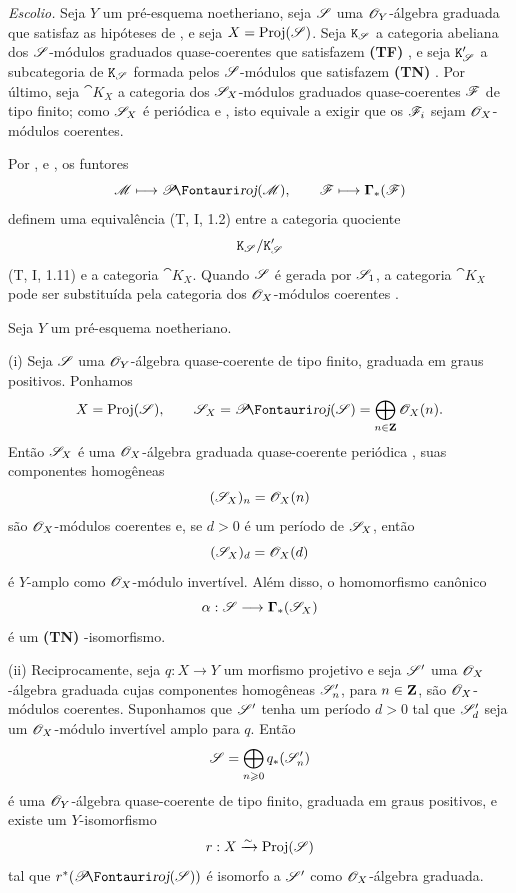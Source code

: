 \begin{env}[2.3.3]
\label{III.2.3.3}
\emph{Escolio.}
Seja $Y$ um pré-esquema noetheriano, seja $\mathscr{S}$ uma $\mathscr{O}_Y$-álgebra graduada que satisfaz as hipóteses de , e seja $X=\operatorname{Proj}(\mathscr{S})$.
Seja $\mathtt{K}_{\mathscr{S}}$ a categoria abeliana dos $\mathscr{S}$-módulos graduados quase-coerentes que satisfazem \textbf{(TF) }, e seja $\mathtt{K}'_{\mathscr{S}}$ a subcategoria de $\mathtt{K}_{\mathscr{S}}$ formada pelos $\mathscr{S}$-módulos que satisfazem \textbf{(TN) }.
Por último, seja $\cat{K}_X$ a categoria dos $\mathscr{S}_X$-módulos graduados quase-coerentes $\mathscr{F}$ de tipo finito; como $\mathscr{S}_X$ é periódica  e , isto equivale a exigir que os $\mathscr{F}_i$ sejam $\mathscr{O}_X$-módulos coerentes.

Por ,  e , os funtores
\[
  \sh{M}\longmapsto\shProj(\sh{M}),
  \qquad
  \sh{F}\longmapsto\bbGamma_*(\sh{F})
\]
definem uma equivalência (T, I, 1.2) entre a categoria quociente
\[
  \mathtt{K}_{\mathscr{S}}/\mathtt{K}'_{\mathscr{S}}
\]
(T, I, 1.11) e a categoria $\cat{K}_X$.
Quando $\mathscr{S}$ é gerada por $\mathscr{S}_1$, a categoria $\cat{K}_X$ pode ser substituída pela categoria dos $\mathscr{O}_X$-módulos coerentes .
\end{env}

\begin{proposition}[2.3.4]
\label{III.2.3.4}
Seja $Y$ um pré-esquema noetheriano.

(i) Seja $\mathscr{S}$ uma $\mathscr{O}_Y$-álgebra quase-coerente de tipo finito, graduada em graus positivos.
Ponhamos
\[
  X=\Proj(\sh{S}),\qquad
  \sh{S}_X=\shProj(\sh{S})
  =\bigoplus_{n\in\bb{Z}}\sh{O}_X(n).
\]
Então $\mathscr{S}_X$ é uma $\mathscr{O}_X$-álgebra graduada quase-coerente periódica , suas componentes homogêneas
\[
  (\mathscr{S}_X)_n=\mathscr{O}_X(n)
\]
são $\mathscr{O}_X$-módulos coerentes e, se $d>0$ é um período de $\mathscr{S}_X$, então
\[
  (\mathscr{S}_X)_d=\mathscr{O}_X(d)
\]
é $Y$-amplo como $\mathscr{O}_X$-módulo invertível.
Além disso, o homomorfismo canônico
\[
  \alpha:\mathscr{S}\longrightarrow\boldsymbol\Gamma_*(\mathscr{S}_X)
\]
é um \textbf{(TN) }-isomorfismo.

(ii) Reciprocamente, seja $q:X\to Y$ um morfismo projetivo e seja $\mathscr{S}'$ uma $\mathscr{O}_X$-álgebra graduada cujas componentes homogêneas $\mathscr{S}'_n$, para $n\in\mathbf{Z}$, são $\mathscr{O}_X$-módulos coerentes.
Suponhamos que $\mathscr{S}'$ tenha um período $d>0$ tal que $\mathscr{S}'_d$ seja um $\mathscr{O}_X$-módulo invertível amplo para $q$.
Então
\[
  \mathscr{S}=\bigoplus_{n\geqslant0}q_*(\mathscr{S}'_n)
\]
é uma $\mathscr{O}_Y$-álgebra quase-coerente de tipo finito, graduada em graus positivos, e existe um $Y$-isomorfismo
\[
  r:X\xrightarrow{\sim}\operatorname{Proj}(\mathscr{S})
\]
tal que $r^*(\shProj(\sh{S}))$ é isomorfo a $\mathscr{S}'$ como $\mathscr{O}_X$-álgebra graduada.
\end{proposition}

